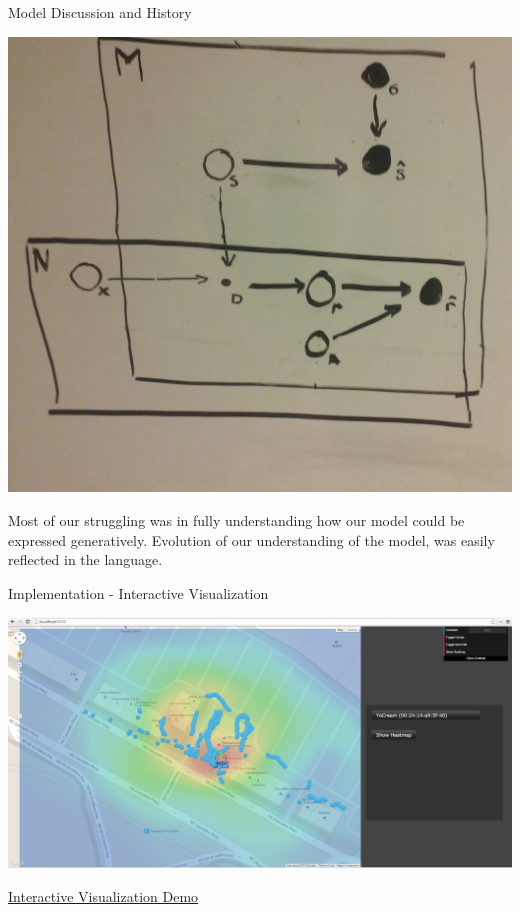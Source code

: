 \documentclass[11pt]{beamer}
\begin{document}
\begin{frame}{Model Discussion and History}
\begin{multicols}{3}
\includegraphics[width=0.3\textheight]{pictures/3plate.jpg}
\vfill\columnbreak

Most of our struggling was in fully understanding how our model could be expressed generatively. 
\newline\newline
Evolution of our understanding of the model, was easily reflected in the language. 
\end{multicols}

\end{frame}



\begin{frame}{Implementation - Interactive Visualization}

\includegraphics[height=0.55\textheight]{pictures/screenshot4.png}

\href{http://localhost:8000/}{Interactive Visualization Demo}

\end{frame}
\end{document}

